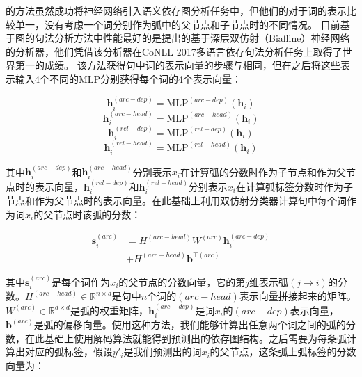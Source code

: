 的方法虽然成功将神经网络引入语义依存图分析任务中，但他们的对于词的表示比较单一，没有考虑一个词分别作为弧中的父节点和子节点时的不同情况。
目前基于图的句法分析方法中性能最好的是提出的基于深层双仿射（Biaffine）神经网络的分析器，他们凭借该分析器在CoNLL 2017多语言依存句法分析任务上取得了世界第一的成绩。
该方法获得句中词的表示向量的步骤与相同，但在之后将这些表示输入4个不同的MLP分别获得每个词的4个表示向量：

\begin{equation}
\mathbf{h}^{(arc-dep)}_i = \text{MLP}^{(arc-dep)}(\mathbf{h}_i)
\end{equation}
\begin{equation}
\mathbf{h}^{(arc-head)}_i = \text{MLP}^{(arc-head)}(\mathbf{h}_i)
\end{equation}
\begin{equation}
\mathbf{h}^{(rel-dep)}_i = \text{MLP}^{(rel-dep)}(\mathbf{h}_i)
\end{equation}
\begin{equation}
\mathbf{h}^{(rel-head)}_i = \text{MLP}^{(rel-head)}(\mathbf{h}_i)
\end{equation}

其中$\mathbf{h}^{(arc-dep)}_i$和$\mathbf{h}^{(arc-head)}_i$分别表示$x_i$在计算弧的分数时作为子节点和作为父节点时的表示向量，$\mathbf{h}^{(rel-dep)}_i$和$\mathbf{h}^{(rel-head)}_i$分别表示$x_i$在计算弧标签分数时作为子节点和作为父节点时的表示向量。在此基础上利用双仿射分类器计算句中每个词作为词$x_i$的父节点时该弧的分数：

\begin{equation}
\begin{split}
\mathbf{s}^{(arc)}_i & = H^{(arc-head)}W^{(arc)}\mathbf{h}^{(arc-dep)}_i \\
& + H^{(arc-head)}\mathbf{b}^{\top(arc)}
\end{split}
\end{equation}

其中$\mathbf{s}^{(arc)}_i$是每个词作为$x_i$的父节点的分数向量，它的第$j$维表示弧$(j\rightarrow i)$的分数。$H^{(arc-head)} \in \mathbb{R}^{n \times d}$是句中$n$个词的$(arc-head)$表示向量拼接起来的矩阵。$W^{(arc)} \in \mathbb{R}^{d \times d}$是弧的权重矩阵，$\mathbf{h}^{(arc-dep)}_i$是词$x_i$的$(arc-dep)$表示向量，$\mathbf{b}^{(arc)}$是弧的偏移向量。使用这种方法，我们能够计算出任意两个词之间的弧的分数，在此基础上使用解码算法就能得到预测出的依存图结构。之后需要为每条弧计算出对应的弧标签，假设$y'_i$是我们预测出的词$x_i$的父节点，这条弧上弧标签的分数向量为：

